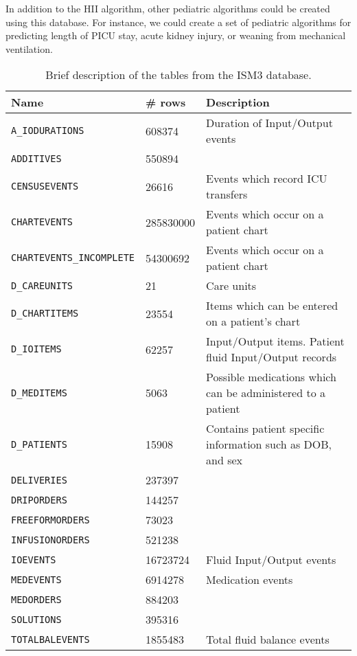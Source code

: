 \documentclass[
   technote
]{phildoc}
\begin{document}
In addition to the HII algorithm, other pediatric algorithms could be created using this database. For instance, we could create a set of pediatric algorithms for predicting length of PICU stay, acute kidney injury, or weaning from mechanical ventilation.     
     

\begin{table}[h!]
\center
\caption{Brief description of the tables from the ISM3 database.}
\label{ISM3_tables}
\begin{tabular}{l|l|l}
	\hline
	\textbf{Name} & \textbf{\# rows} & \textbf{Description} \\
	\hline
	\hline
	\verb|A_IODURATIONS| & 608374 & Duration of Input/Output events\\
	\hline
	\verb|ADDITIVES| & 550894 & \\
	\hline
	\verb|CENSUSEVENTS| & 26616 & Events which record ICU transfers \\	
	\hline
	\verb|CHARTEVENTS| & 285830000 & Events which occur on a patient chart \\
	\hline
	\verb|CHARTEVENTS_INCOMPLETE| & 54300692 & Events which occur on a patient chart\\
	\hline
	\verb|D_CAREUNITS| & 21 & Care units\\
	\hline
	\verb|D_CHARTITEMS| & 23554 & Items which can be entered on a patient's chart\\
	\hline
	\verb|D_IOITEMS| & 62257 & Input/Output items. Patient fluid Input/Output records\\
	\hline
	\verb|D_MEDITEMS| & 5063 & Possible medications which can be administered to a patient\\
	\hline
	\verb|D_PATIENTS| & 15908 & Contains patient specific information such as DOB, and sex \\
	\hline
	\verb|DELIVERIES| & 237397 & \\
	\hline
	\verb|DRIPORDERS| & 144257 & \\
	\hline
	\verb|FREEFORMORDERS| & 73023 & \\
	\hline
	\verb|INFUSIONORDERS| & 521238 & \\
	\hline
	\verb|IOEVENTS| & 16723724 & Fluid Input/Output events\\
	\hline
	\verb|MEDEVENTS| & 6914278 & Medication events\\
	\hline
	\verb|MEDORDERS| & 884203 & \\
	\hline 
	\verb|SOLUTIONS| & 395316 & \\
	\hline
	\verb|TOTALBALEVENTS| & 1855483 & Total fluid balance events\\
	\hline
	\hline
\end{tabular}
\end{table} 
\end{document}

